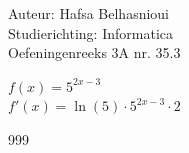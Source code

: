 \documentclass[a4paper]{article}
\begin{document}
\noindent \large Auteur: Hafsa Belhasnioui \\
\noindent \large Studierichting: Informatica\\
\noindent \large Oefeningenreeks 3A nr. 35.3\\

\medskip

\normalsize

$f(x) = 5^{2x-3}$ \\

$f'(x) = \ln(5) \cdot 5^{2x-3} \cdot 2$ \\

\begin{thebibliography}{999}
\end{thebibliography}
\end{document}
